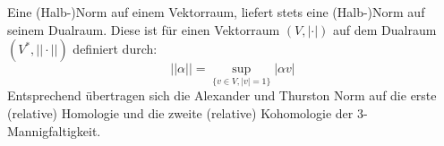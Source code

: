     \begin{bsp}
        Eine (Halb-)Norm auf einem Vektorraum, liefert stets eine (Halb-)Norm auf seinem Dualraum. Diese ist für einen Vektorraum $(V,|\cdot|)$ auf dem Dualraum $(V^*,||\cdot||)$ definiert durch:
        \[
             ||\alpha||= \sup_{\{v\in V, |v|=1\}} |\alpha v|
         \] 
         Entsprechend übertragen sich die Alexander und Thurston Norm auf die erste (relative) Homologie und die zweite (relative) Kohomologie der 3-Mannigfaltigkeit. 
    \end{bsp}